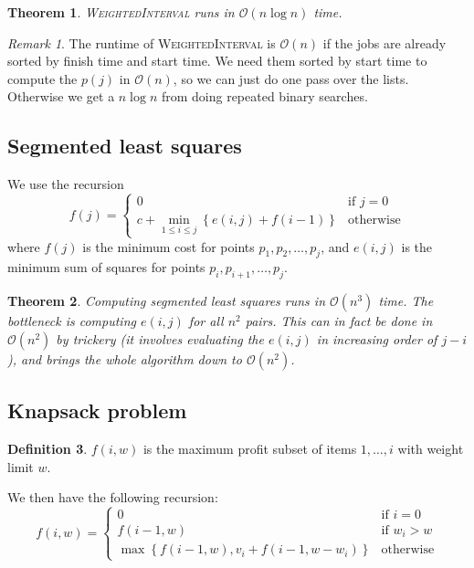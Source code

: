 \documentclass[10pt, oneside, reqno]{amsart}
\theoremstyle{plain}%
\newtheorem{thm}{Theorem}[section]
\theoremstyle{definition}
\newtheorem{defn}[thm]{Definition}
\theoremstyle{remark}
\newtheorem*{rem}{Remark}
\newcommand{\bigo}[1]{\mathcal{O}(#1)}
\begin{document}
\begin{thm}
    \textsc{WeightedInterval} runs in $\bigo{n \log n}$ time.
\end{thm}

\begin{rem}
The runtime of \textsc{WeightedInterval} is $\bigo{n}$ if the jobs are already sorted by finish time and start time. We need them sorted by start time to compute the $p(j)$ in $\bigo{n}$, so we can just do one pass over the lists. Otherwise we get a $n \log n$ from doing repeated binary searches.
\end{rem}


\subsection{Segmented least squares} %
\label{sub:segmented_least_squres}

We use the recursion 
\[
    f(j) = \begin{cases}
        0 &\text{if $j = 0$} \\
    \displaystyle c + \min_{1 \leq i \leq j} \left\{ e(i,j) + f(i-1)\right\} &\text{otherwise}          \end{cases}
\] where $f(j)$ is the minimum cost for points $p_1, p_2, \dots, p_j$, and $e(i,j)$ is the minimum sum of squares for points $p_i, p_{i+1},\dots, p_j$.

\begin{thm}
    Computing segmented least squares runs in $\bigo{n^3}$ time.  The bottleneck is computing $e(i,j)$ for all $n^2$ pairs. This can in fact be done in $\bigo{n^2}$ by trickery (it involves evaluating the $e(i,j)$ in increasing order of $j - i$), and brings the whole algorithm down to $\bigo{n^2}$.
\end{thm}


\subsection{Knapsack problem} %
\label{sub:knapsack_problem}

\begin{defn}
    $f(i,w)$ is the maximum profit subset of items $1, \dots, i$ with weight limit $w$.  
\end{defn}

We then have the following recursion:
\[
    f(i,w) = \begin{cases}
        0       &\text{if $i = 0$}\\
        f(i-1,w)&\text{if $w_i > w$}\\
        \max \left\{ f(i-1,w), v_i + f(i-1, w - w_i)\right\} &\text{otherwise}
    \end{cases}
\]
\end{document}
